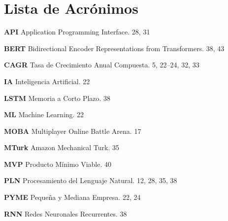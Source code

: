 \chapter*{Lista de Acrónimos}

\noindent \textbf{API} \quad Application Programming Interface. 28, 31

\vspace{0.3cm}
\noindent \textbf{BERT} \quad Bidirectional Encoder Representations from Transformers. 38, 43

\vspace{0.3cm}
\noindent \textbf{CAGR} \quad Tasa de Crecimiento Anual Compuesta. 5, 22--24, 32, 33

\vspace{0.3cm}
\noindent \textbf{IA} \quad Inteligencia Artificial. 22

\vspace{0.3cm}
\noindent \textbf{LSTM} \quad Memoria a Corto Plazo. 38

\vspace{0.3cm}
\noindent \textbf{ML} \quad Machine Learning. 22

\vspace{0.3cm}
\noindent \textbf{MOBA} \quad Multiplayer Online Battle Arena. 17

\vspace{0.3cm}
\noindent \textbf{MTurk} \quad Amazon Mechanical Turk. 35

\vspace{0.3cm}
\noindent \textbf{MVP} \quad Producto Mínimo Viable. 40

\vspace{0.3cm}
\noindent \textbf{PLN} \quad Procesamiento del Lenguaje Natural. 12, 28, 35, 38

\vspace{0.3cm}
\noindent \textbf{PYME} \quad Pequeña y Mediana Empresa. 22, 24

\vspace{0.3cm}
\noindent \textbf{RNN} \quad Redes Neuronales Recurrentes. 38
